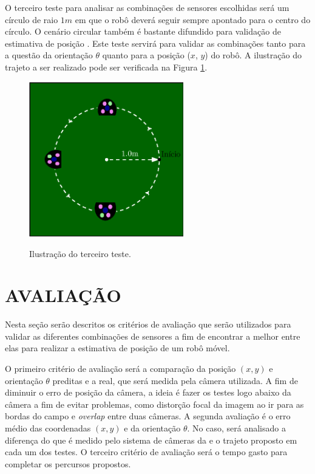 \documentclass[acronym, symbols, table]{fei}
\begin{document}
		O terceiro teste para analisar as combinações de sensores escolhidas será um círculo de raio $1m$ em que o robô deverá seguir sempre apontado para o centro do círculo. O cenário circular também é bastante difundido para validação de estimativa de posição \cites{suliman2009mobile}{marton2013two}{rigatos2010extended}{eman2020mobile}. Este teste servirá para validar as combinações tanto para a questão da orientação $\theta$ quanto para a posição ($x$, $y$) do robô. A ilustração do trajeto a ser realizado pode ser verificada na Figura \ref{fig:metodologia_teste_3}.
		
		\begin{figure}[!htb]
			\centering
			\caption{Ilustração do terceiro teste.}
			\includegraphics[width=0.6\textwidth]{teste_3.eps}
			\label{fig:metodologia_teste_3}
		\end{figure}
		
	\section{AVALIAÇÃO}\label{sec:metodologia_avaliacao}
	
		Nesta seção serão descritos os critérios de avaliação que serão utilizados para validar as diferentes combinações de sensores a fim de encontrar a melhor entre elas para realizar a estimativa de posição de um robô móvel.
		
		O primeiro critério de avaliação será a comparação da posição $(x, y)$ e orientação $\theta$ preditas e a real, que será medida pela câmera utilizada. A fim de diminuir o erro de posição da câmera, a ideia é fazer os testes logo abaixo da câmera a fim de evitar problemas, como distorção focal da imagem ao ir para as bordas do campo e \textit{overlap} entre duas câmeras. A segunda avaliação é o erro médio das coordenadas $(x ,y)$ e da orientação $\theta$. No caso, será analisado a diferença do que é medido pelo sistema de câmeras da  e o trajeto proposto em cada um dos testes. O terceiro critério de avaliação será o tempo gasto para completar os percursos propostos.
		
\end{document}
